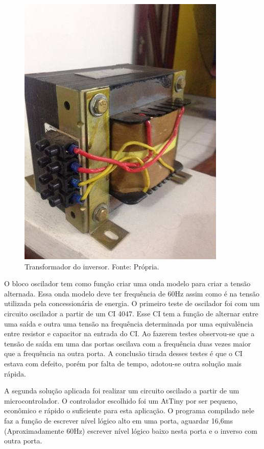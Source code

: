                 \begin{figure}[!htb]
            		\centering
            		\includegraphics[scale= 0.3]{figuras/Transformador_Inversor.jpg}
            		\caption{Transformador do inversor. Fonte: Própria.}
            		\label{transformador-inversor}
            	\end{figure}  
     
            	O bloco oscilador tem como função criar uma onda modelo para criar a tensão 					alternada. Essa onda modelo deve ter frequência de 60Hz assim como é na tensão 				utilizada pela concessionária de energia. O primeiro teste de oscilador foi 					com um circuito oscilador a partir de um CI 4047. Esse CI tem a função de 						alternar entre uma saída e outra uma tensão na frequência determinada por uma 					equivalência entre resistor e capacitor na entrada do CI. Ao fazerem testes 					observou-se que a tensão de saída em uma das portas oscilava com a frequência 					duas vezes maior que a frequência na outra porta. A conclusão tirada desses 					testes é que o CI estava com defeito, porém por falta de tempo, adotou-se 						outra solução mais rápida.
            	
				A segunda solução aplicada foi realizar um circuito oscilado a partir de um 					microcontrolador. O controlador escolhido foi um AtTiny por ser pequeno, 						econômico e rápido o suficiente para esta aplicação. O programa compilado nele 				faz a função de escrever nível lógico alto em uma porta, aguardar 16,6ms 						(Aproximadamente 60Hz) escrever nível lógico baixo nesta porta e o inverso com 				outra porta. 	

